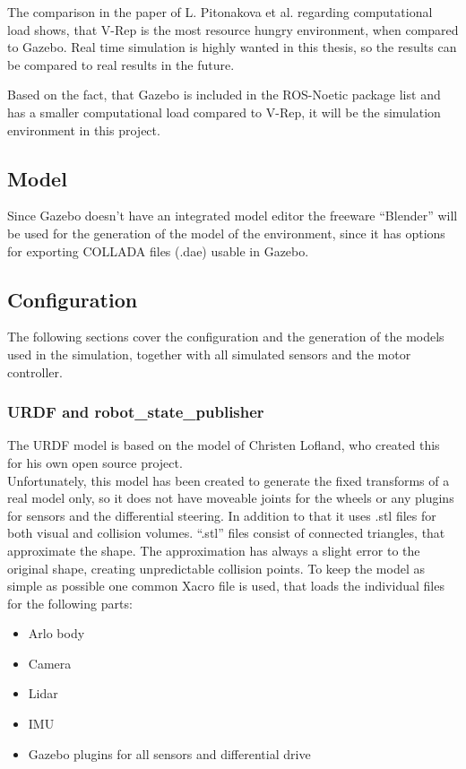 The comparison in the paper of L. Pitonakova et al. regarding computational load shows, that V-Rep is the most resource hungry environment, when compared to  Gazebo\cite{Pitonakova}. Real time simulation is highly wanted in this thesis, so the results can be compared to real results in the future.

Based on the fact, that Gazebo is included in the ROS-Noetic package list and has a smaller computational load compared to V-Rep, it will be the simulation environment in this project.

\subsection{Model}
Since Gazebo doesn't have an integrated model editor the freeware ``Blender'' will be used for the generation of the model of the environment, since it has options for exporting COLLADA files (.dae) usable in Gazebo.

\subsection{Configuration}
The following sections cover the configuration and the generation of the models used in the simulation, together with all simulated sensors and the motor controller.


\subsubsection{URDF and robot\_state\_publisher}

The URDF model is based on the model of Christen Lofland, who created this for his own open source project\cite{chrisl8}.\\

Unfortunately, this model has been created to generate the fixed transforms of a real model only, so it does not have moveable joints for the wheels or any plugins for sensors and the differential steering. In addition to that it uses .stl files for both visual and collision volumes. ``.stl'' files consist of connected triangles, that approximate the shape. The approximation has always a slight error to the original shape, creating unpredictable collision points.
To keep the model as simple as possible one common Xacro file is used, that loads the individual files for the following parts:
\begin{itemize}
	\item Arlo body
	\item Camera
	\item Lidar
	\item IMU
	\item Gazebo plugins for all sensors and differential drive
\end{itemize}

